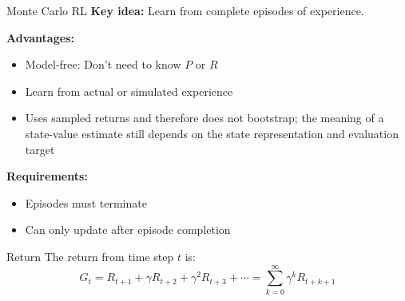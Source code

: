 \documentclass[aspectratio=169]{beamer}
\begin{document}
\begin{frame}{Monte Carlo RL}
  \textbf{Key idea:} Learn from complete episodes of experience.

  \vspace{0.5em}

  \textbf{Advantages:}
  \begin{itemize}
    \item \alert{Model-free:} Don't need to know $P$ or $R$
    \item Learn from actual or simulated experience
    \item Uses sampled returns and therefore does not bootstrap; the meaning of a state-value estimate still depends on the state representation and evaluation target
  \end{itemize}

  \vspace{0.5em}

  \textbf{Requirements:}
  \begin{itemize}
    \item Episodes must terminate
    \item Can only update after episode completion
  \end{itemize}

  \vspace{0.5em}

  \begin{definitionbox}{Return}
    The return from time step $t$ is:
    $$G_t = R_{t+1} + \gamma R_{t+2} + \gamma^2 R_{t+3} + \cdots = \sum_{k=0}^\infty \gamma^k R_{t+k+1}$$
  \end{definitionbox}
\end{frame}
\end{document}
